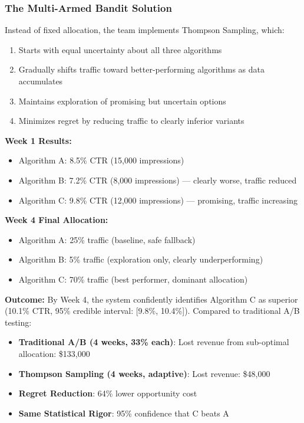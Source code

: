 \subsubsection{The Multi-Armed Bandit Solution}

Instead of fixed allocation, the team implements Thompson Sampling, which:

\begin{enumerate}
    \item Starts with equal uncertainty about all three algorithms
    \item Gradually shifts traffic toward better-performing algorithms as data accumulates
    \item Maintains exploration of promising but uncertain options
    \item Minimizes regret by reducing traffic to clearly inferior variants
\end{enumerate}

\textbf{Week 1 Results:}
\begin{itemize}
    \item Algorithm A: 8.5\% CTR (15,000 impressions)
    \item Algorithm B: 7.2\% CTR (8,000 impressions) --- clearly worse, traffic reduced
    \item Algorithm C: 9.8\% CTR (12,000 impressions) --- promising, traffic increasing
\end{itemize}

\textbf{Week 4 Final Allocation:}
\begin{itemize}
    \item Algorithm A: 25\% traffic (baseline, safe fallback)
    \item Algorithm B: 5\% traffic (exploration only, clearly underperforming)
    \item Algorithm C: 70\% traffic (best performer, dominant allocation)
\end{itemize}

\textbf{Outcome:} By Week 4, the system confidently identifies Algorithm C as superior (10.1\% CTR, 95\% credible interval: [9.8\%, 10.4\%]). Compared to traditional A/B testing:

\begin{itemize}
    \item \textbf{Traditional A/B (4 weeks, 33\% each)}: Lost revenue from sub-optimal allocation: \$133,000
    \item \textbf{Thompson Sampling (4 weeks, adaptive)}: Lost revenue: \$48,000
    \item \textbf{Regret Reduction}: 64\% lower opportunity cost
    \item \textbf{Same Statistical Rigor}: 95\% confidence that C beats A
\end{itemize}

